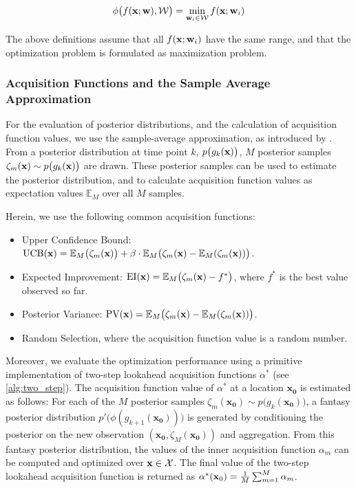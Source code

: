 \begin{equation}
\phi\big(f({\mathbf{x}}; {\mathbf{w}}), \mathcal{W}\big)  = \min_{{\mathbf{w}}_i \in \mathcal{W}} f({\mathbf{x}}; {\mathbf{w}}_i)
\end{equation}

The above definitions assume that all $f({\mathbf{x}}; {\mathbf{w}}_i)$ have the same range, and that the optimization problem is formulated as maximization problem. 

\subsubsection{Acquisition Functions and the Sample Average Approximation} \label{App:acqf}

For the evaluation of posterior distributions, and the calculation of acquisition function values, we use the sample-average approximation, as introduced by \citet{balandat_botorch_2020}. 
From a posterior distribution at time point $k$, $p\big(g_k({\mathbf{x}})\big)$, $M$ posterior samples $\zeta_{m}({\mathbf{x}}) \sim p\big(g_k({\mathbf{x}})\big)$ are drawn. 
These posterior samples can be used to estimate the posterior distribution, and to calculate acquisition function values as expectation values $\mathbb{E}_M$ over all $M$ samples.

Herein, we use the following common acquisition functions: 
\begin{itemize}
    \item Upper Confidence Bound: $\text{UCB}({\mathbf{x}}) = \mathbb{E}_M\big(\zeta_{m}({\mathbf{x}})\big) + \beta \cdot \mathbb{E}_M\big(\zeta_{m}({\mathbf{x}}) - \mathbb{E}_M(\zeta_{m}({\mathbf{x}}))\big)$.
    \item Expected Improvement: $\text{EI}({\mathbf{x}}) = \mathbb{E}_M\big(\zeta_{m}({\mathbf{x}}) - f^*\big)$, where $f^{*}$ is the best value observed so far.
    \item Posterior Variance: $\text{PV}({\mathbf{x}}) = \mathbb{E}_M\big(\zeta_{m}({\mathbf{x}}) - \mathbb{E}_M(\zeta_{m}({\mathbf{x}}))\big)$. 
    \item Random Selection, where the acquisition function value is a random number. 
\end{itemize}

Moreover, we evaluate the optimization performance using a primitive implementation of two-step lookahead acquisition functions $\alpha^{*}$ (see \cref{alg:two_step}). 
The acquisition function value of $\alpha^{*}$ at a location $\mathbf{x_0}$ is estimated as follows: For each of the $M$ posterior samples $\zeta_m(\mathbf{x_0}) \sim p\big(g_k(\mathbf{x_0})\big)$, a fantasy posterior distribution $p'\big(\phi(g_{k+1}(\mathbf{x_0}))\big)$ is generated by conditioning the posterior on the new observation $(\mathbf{x_0}, \zeta_M(\mathbf{x_0}))$ and aggregation. From this fantasy posterior distribution, the values of the inner acquisition function $\alpha_m$ can be computed and optimized over ${\mathbf{x}} \in \mathcal{X}$. The final value of the two-step lookahead acquisition function is returned as $\alpha^{*}({\mathbf{x}}_0) = \frac{1}{M} \sum_{m=1}^M \alpha_m$.


